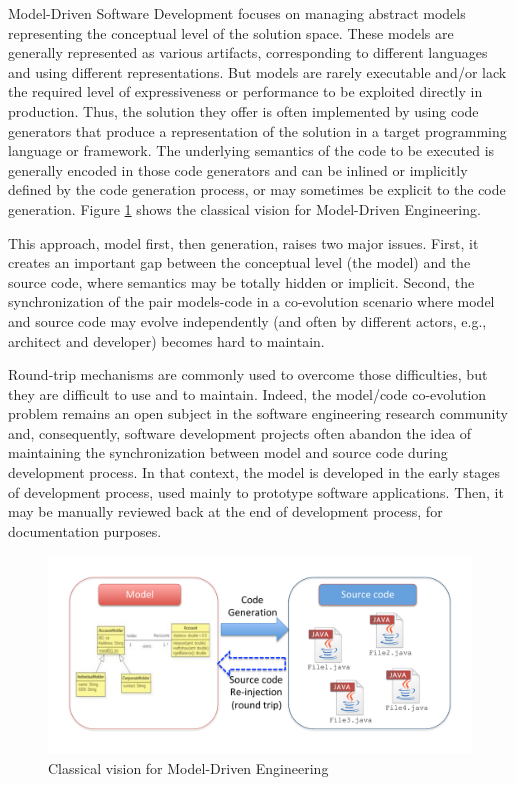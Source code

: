 

Model-Driven Software Development focuses on managing abstract models representing the conceptual level of the solution space. These models are generally represented as various artifacts, corresponding to different languages and using different representations. But models are rarely executable and/or lack the required level of expressiveness or performance to be exploited directly in production. Thus, the solution they offer is often implemented by using code generators that produce a representation of the solution in a target programming language or framework\cite{stahl2006model}. The underlying semantics of the code to be executed is generally encoded in those code generators and can be inlined or implicitly defined by the code generation process, or may sometimes be explicit to the code generation. Figure \ref{fig:ClassicalVision} shows the classical vision for Model-Driven Engineering.

This approach, model first, then generation, raises two major issues. First, it creates an important gap between the conceptual level (the model) and the source code, where semantics may be totally hidden or implicit. Second, the synchronization of the pair models-code in a co-evolution scenario where model and source code may evolve independently (and often by different actors, e.g., architect and developer) becomes hard to maintain.

Round-trip mechanisms are commonly used to overcome those difficulties, but they are difficult to use and to maintain. Indeed, the model/code co-evolution problem remains an open subject in the software engineering research community and, consequently, software development projects often abandon the idea of maintaining the synchronization between model and source code during development process. In that context, the model is developed in the early stages of development process, used mainly to prototype software applications. Then, it may be manually reviewed back at the end of development process, for documentation purposes.

\begin{figure}
    \centering
    \includegraphics[width=1.0\columnwidth]{figures/ClassicalVision.pdf}
    \caption{Classical vision for Model-Driven Engineering}
    \label{fig:ClassicalVision}
\end{figure}

